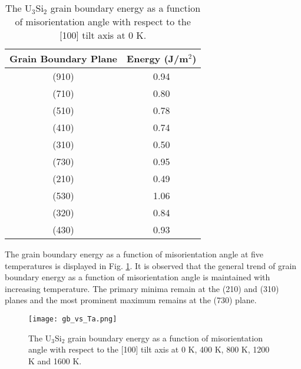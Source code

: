 \documentclass[review]{elsarticle}
\begin{document}
\begin{table}[h]
\caption{The U$_{3}$Si$_{2}$ grain boundary energy as a function of misorientation angle with respect to the [100] tilt axis at 0 K.} \label{tab:200k}
\begin{center}
\begin{tabular}{|c|c|}
	\hline
	Grain Boundary Plane & Energy (J/m$^{2}$) \\
	 \hline
	 (910) & 0.94 \\
	 (710) & 0.80 \\
	 (510) & 0.78 \\
	 (410) & 0.74 \\
	 (310) & 0.50 \\	 
	 (730) & 0.95 \\
	 (210) & 0.49 \\
	 (530) & 1.06 \\
	 (320) & 0.84 \\
	 (430) & 0.93 \\
	 \hline
\end{tabular}
\end{center}
\label{default}
\end{table}

\FloatBarrier

The grain boundary energy as a function of misorientation angle at five temperatures is displayed in Fig. \ref{fig:gbtemp}. It is observed that the general trend of grain boundary energy as a function of misorientation angle is maintained with increasing temperature. The primary minima remain at the (210) and (310) planes and the most prominent maximum remains at the (730) plane. 

\begin{figure}[h]
 \centering
 \texttt{[image: gb\_vs\_Ta.png]} 
 \caption{The U$_{3}$Si$_{2}$ grain boundary energy as a function of misorientation angle with respect to the [100] tilt axis at 0 K, 400 K, 800 K, 1200 K and 1600 K.}
 \label{fig:gbtemp}
\end{figure}

\FloatBarrier
\end{document}
